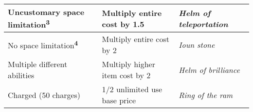 \begin{longtable}{llllll}
\hline
\multicolumn{4}{p{1.366in}|}{\begin{minipage}[t]{1.366in}\raggedright
Uncustomary space limitation\textsuperscript{\textbf{3}}\textbf{ }\end{minipage}} & \multicolumn{1}{|p{1.506in}|}{\begin{minipage}[t]{1.506in}\raggedright
Multiply entire cost by 1.5 \end{minipage}} & \multicolumn{1}{p{1.628in}|}{\begin{minipage}[t]{1.628in}\raggedright
\textit{Helm of teleportation}\end{minipage}}\\
\hline
\multicolumn{4}{p{1.366in}|}{\begin{minipage}[t]{1.366in}\raggedright
No space limitation\textsuperscript{\textbf{4}}\textbf{ }\end{minipage}} & \multicolumn{1}{|p{1.506in}|}{\begin{minipage}[t]{1.506in}\raggedright
Multiply entire cost by 2 \end{minipage}} & \multicolumn{1}{p{1.628in}|}{\begin{minipage}[t]{1.628in}\raggedright
\textit{Ioun stone}\end{minipage}}\\
\hline
\multicolumn{4}{p{1.366in}|}{\begin{minipage}[t]{1.366in}\raggedright
Multiple different abilities \end{minipage}} & \multicolumn{1}{|p{1.506in}|}{\begin{minipage}[t]{1.506in}\raggedright
Multiply higher item cost by 2 \end{minipage}} & \multicolumn{1}{p{1.628in}|}{\begin{minipage}[t]{1.628in}\raggedright
\textit{Helm of brilliance}\end{minipage}}\\
\hline
\multicolumn{4}{p{1.366in}|}{\begin{minipage}[t]{1.366in}\raggedright
Charged (50 charges) \end{minipage}} & \multicolumn{1}{|p{1.506in}|}{\begin{minipage}[t]{1.506in}\raggedright
1/2 unlimited use base price \end{minipage}} & \multicolumn{1}{p{1.628in}|}{\begin{minipage}[t]{1.628in}\raggedright
\textit{Ring of the ram}\end{minipage}}\\

\end{longtable}
